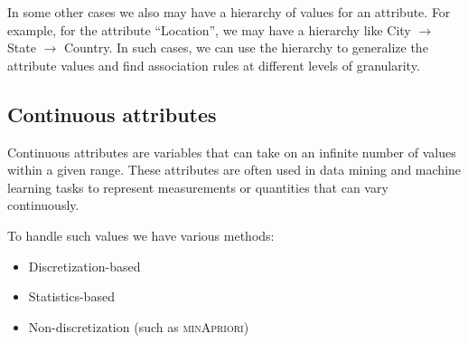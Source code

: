 In some other cases we also may have a hierarchy of values for an attribute. For example, for the attribute ``Location'', we may have a hierarchy like City $\rightarrow$ State $\rightarrow$ Country. In such cases, we can use the hierarchy to generalize the attribute values and find association rules at different levels of granularity.

\subsection{Continuous attributes}
Continuous attributes are variables that can take on an infinite number of values within a given range. These attributes are often used in data mining and machine learning tasks to represent measurements or quantities that can vary continuously.

To handle such values we have various methods:
\begin{itemize}
   \item Discretization-based
   \item Statistics-based
   \item Non-discretization (such as \textsc{minApriori})
\end{itemize}

